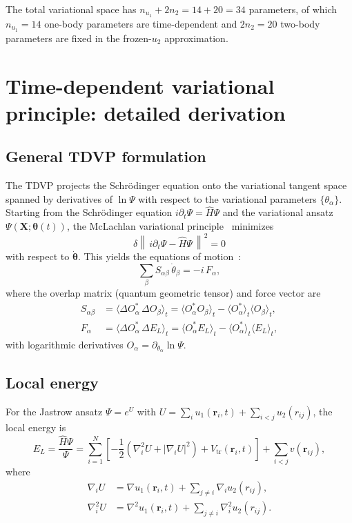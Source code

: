 \documentclass[aps,prl,onecolumn,superscriptaddress,longbibliography,nofootinbib]{revtex4-2}
\newcommand{\br}{\mathbf{r}}
\newcommand{\bx}{\mathbf{X}}
\newcommand{\avg}[1]{\langle #1 \rangle}
\begin{document}
The total variational space has $n_{u_1}+2n_2=14+20=34$ parameters,
of which $n_{u_1}=14$ one-body parameters are time-dependent and
$2n_2=20$ two-body parameters are fixed in the frozen-$u_2$
approximation.

\section{Time-dependent variational principle: detailed derivation}
\label{sec:tdvp}

\subsection{General TDVP formulation}

The TDVP projects the Schr\"odinger equation onto the variational
tangent space spanned by derivatives of $\ln\Psi$ with respect to the
variational parameters $\{\theta_\alpha\}$.  Starting from the
Schr\"odinger equation $i\partial_t\Psi = \hat{H}\Psi$ and the
variational ansatz $\Psi(\bx;\bm\theta(t))$, the McLachlan variational
principle~\cite{McLachlan1964} minimizes
\begin{equation}
\delta\!\left\|\,i\partial_t\Psi - \hat{H}\Psi\,\right\|^2 = 0
\end{equation}
with respect to $\dot{\bm\theta}$.  This yields the equations of
motion~\cite{Carleo2012}:
\begin{equation}
\sum_\beta S_{\alpha\beta}\,\dot\theta_\beta = -i\,F_\alpha,
\label{eq:tdvp}
\end{equation}
where the overlap matrix (quantum geometric tensor) and force vector are
\begin{align}
S_{\alpha\beta} &= \avg{\Delta O_\alpha^*\,\Delta O_\beta}_t
= \avg{O_\alpha^* O_\beta}_t - \avg{O_\alpha^*}_t\avg{O_\beta}_t,
\label{eq:S_def}\\
F_\alpha &= \avg{\Delta O_\alpha^*\,\Delta E_L}_t
= \avg{O_\alpha^* E_L}_t - \avg{O_\alpha^*}_t\avg{E_L}_t,
\label{eq:F_def}
\end{align}
with logarithmic derivatives $O_\alpha =
\partial_{\theta_\alpha}\ln\Psi$.

\subsection{Local energy}

For the Jastrow ansatz $\Psi=e^U$ with
$U=\sum_i u_1(\br_i,t)+\sum_{i<j}u_2(r_{ij})$, the local energy is
\begin{equation}
E_L = \frac{\hat{H}\Psi}{\Psi} = \sum_{i=1}^N\left[
-\frac{1}{2}(\nabla_i^2 U + |\nabla_i U|^2) + V_{\mathrm{tr}}(\br_i,t)
\right] + \sum_{i<j} v(\br_{ij}),
\label{eq:EL}
\end{equation}
where
\begin{align}
\nabla_i U &= \nabla u_1(\br_i,t) + \sum_{j\neq i}\nabla_i u_2(r_{ij}),\\
\nabla_i^2 U &= \nabla^2 u_1(\br_i,t)
+ \sum_{j\neq i}\nabla_i^2 u_2(r_{ij}).
\end{align}
\end{document}
